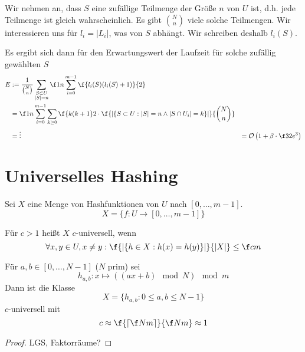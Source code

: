 \documentclass{mycourse}
\renewcommand{\O}{\mathcal{O}}
\begin{document}
Wir nehmen an, dass $S$ eine zufällige Teilmenge der Größe $n$ von $U$ ist, d.h. jede Teilmenge ist gleich wahrscheinlich.
Es gibt $\binom Nn$ viele solche Teilmengen.
Wir interessieren uns für $l_i = |L_i|$, was von $S$ abhängt.
Wir schreiben deshalb $l_i(S)$.

Es ergibt sich dann für den Erwartungswert der Laufzeit für solche zufällig gewählten $S$
\begin{align*}
	E &:= \frac 1 {\binom Nn}\sum_{\substack{S\subset U\\|S|=n}}\f 1n \sum_{i=0}^{m-1}\f{l_i(S)(l_i(S)+1)}{2}\\
	  &=\f 1n \sum_{i=0}^{m-1}\sum_{k\ge 0}\f {k(k+1}2 \cdot \f {|\{S\subset U :|S|=n \land |S\cap U_i| = k\}|}{\binom Nn}\\
   &=\vdots
	&= \O\left(1+ \beta \cdot \f 32 e^3\right)
\end{align*}


\section{Universelles Hashing}


Sei $X$ eine Menge von Hashfunktionen von $U$ nach $[0,\dotsc, m-1]$. 
\[
	X = \{f:U\to [0,\dotsc, m-1]\}
\]
\begin{df}
	Für $c>1$ heißt $X$ $c$-universell, wenn
	\[
		\forall x,y\in U, x\neq y : \f{|\{h\in X : h(x) = h(y) \}|}{|X|} \le \f cm
	\]
\end{df}


\begin{st}
	Für $a,b\in [0,\dotsc, N-1]$ ($N$ prim) sei
	\[
		h_{a,b} : x\mapsto ((ax+b) \mod N) \mod m
	\]
	Dann ist die Klasse
	\[
		X = \{ h_{a,b} : 0\le a,b \le N-1\}
	\]
	$c$-universell mit
	\[
		c \approx \f{\lceil\f Nm\rceil}{\f Nm} \approx 1
	\]
	\begin{proof}
		LGS, Faktorräume?
	\end{proof}
\end{st}
\end{document}
